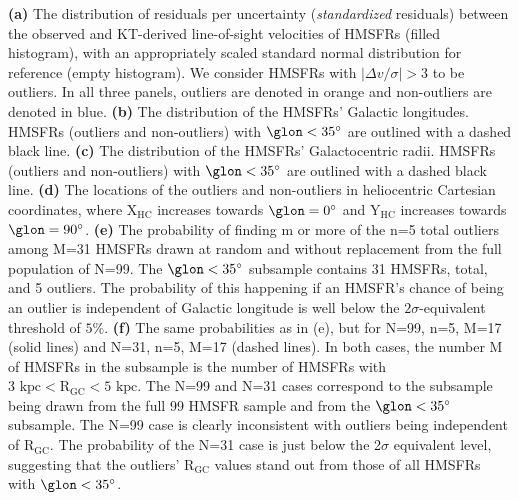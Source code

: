 \label{fig:outliers}
\textbf{(a)} The distribution of residuals per uncertainty (\textit{standardized} residuals) between the observed and KT-derived line-of-sight velocities of HMSFRs (filled histogram), with an appropriately scaled standard normal distribution for reference (empty histogram). We consider HMSFRs with $\vert \Delta v / \sigma \vert > 3$ to be outliers. In all three panels, outliers are denoted in orange and non-outliers are denoted in blue. 
\textbf{(b)} The distribution of the HMSFRs' Galactic longitudes. HMSFRs (outliers and non-outliers) with $\glon < 35^\circ$ are outlined with a dashed black line.
\textbf{(c)} The distribution of the HMSFRs' Galactocentric radii. HMSFRs (outliers and non-outliers) with $\glon < 35^\circ$ are outlined with a dashed black line.
\textbf{(d)} The locations of the outliers and non-outliers in heliocentric Cartesian coordinates, where $\mathrm{X_{HC}}$ increases towards $\glon=0^\circ$ and $\mathrm{Y_{HC}}$ increases towards $\glon=90^\circ$. 
\textbf{(e)} The probability of finding m or more of the n=5 total outliers among M=31 HMSFRs drawn at random and without replacement from the full population of N=99. The $\glon < 35^\circ$ subsample contains 31 HMSFRs, total, and 5 outliers. The probability of this happening if an HMSFR's chance of being an outlier is independent of Galactic longitude is well below the $2\sigma$-equivalent threshold of $5\%$.
\textbf{(f)} The same probabilities as in (e), but for N=99, n=5, M=17 (solid lines) and N=31, n=5, M=17 (dashed lines). In both cases, the number M of HMSFRs in the subsample is the number of HMSFRs with $3 \text{ kpc} < \mathrm{R_{GC}} < 5\text{ kpc}$. The N=99 and N=31 cases correspond to the subsample being drawn from the full 99 HMSFR sample and from the $\glon < 35^\circ$ subsample. The N=99 case is clearly inconsistent with outliers being independent of $\mathrm{R_{GC}}$. The probability of the N=31 case is just below the 2$\sigma$ equivalent level, suggesting that the outliers' $\mathrm{R_{GC}}$ values stand out from those of all HMSFRs with $\glon < 35^\circ$.
